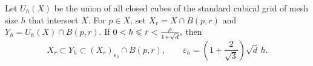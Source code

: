 

\begin{theorem}
  \label{thm:cubical-admissible-set}
Let $U_h(X)$ be the union of all closed cubes of the
standard cubical grid of mesh size $h$ that intersect $X$.
For $p\in X$, set $X_r=X\cap B(p,r)$ and
$Y_h=U_h(X)\cap B(p,r)$.
If
\(
    0<h\leqslant r<\frac{\rho}{1+\sqrt d},
\)
then
\begin{equation}\label{eq:cubical-approximation}
    X_r\subset Y_h
    \subset (X_r)_{\varepsilon_h}\cap B(p,r),
    \qquad
    \varepsilon_h=
    \left(1+\frac{2}{\sqrt3}\right)\sqrt d\,h.
\end{equation}
\end{theorem}

